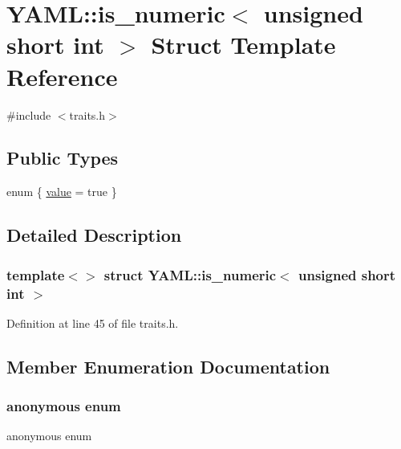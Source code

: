 \hypertarget{struct_y_a_m_l_1_1is__numeric_3_01unsigned_01short_01int_01_4}{}\section{Y\+A\+ML\+::is\+\_\+numeric$<$ unsigned short int $>$ Struct Template Reference}
\label{struct_y_a_m_l_1_1is__numeric_3_01unsigned_01short_01int_01_4}


{\ttfamily \#include $<$traits.\+h$>$}

\subsection*{Public Types}
\begin{DoxyCompactItemize}
\item 
enum \{ \mbox{\hyperlink{struct_y_a_m_l_1_1is__numeric_3_01unsigned_01short_01int_01_4_aecf52ce16e6fde0ccebd9cef00564d0ba09893573c934811659700af3e45e4dc0}{value}} = true
 \}
\end{DoxyCompactItemize}


\subsection{Detailed Description}
\subsubsection*{template$<$$>$\newline
struct Y\+A\+M\+L\+::is\+\_\+numeric$<$ unsigned short int $>$}



Definition at line 45 of file traits.\+h.



\subsection{Member Enumeration Documentation}
\mbox{\label{struct_y_a_m_l_1_1is__numeric_3_01unsigned_01short_01int_01_4_aecf52ce16e6fde0ccebd9cef00564d0b}} 
\subsubsection{\texorpdfstring{anonymous enum}{anonymous enum}}
{\footnotesize\ttfamily anonymous enum}

